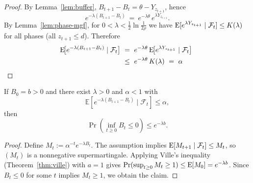 \begin{proof}
	By Lemma~\ref{lem:buffer}, $B_{t+1}-B_t=\theta-Y_{z_{t+1}}$, hence
	\[
	e^{-\lambda(B_{t+1}-B_t)}\ =\ e^{-\lambda\theta}\,e^{\lambda Y_{z_{t+1}}}.
	\]
	By Lemma~\ref{lem:phase-mgf}, for $0<\lambda<\tfrac12\ln\!\tfrac{1}{2\rho}$ we have %
	$\text{E}[e^{\lambda Y_{z_{t+1}}}\mid\mathcal F_t]\le K(\lambda)$ for all phases (all $z_{t+1}\le d$). Therefore
	\begin{align*}
		\text{E}\!\big[e^{-\lambda(B_{t+1}-B_t)}\mid \mathcal F_t\big]
		\ &=\ e^{-\lambda\theta}\,\text{E}\!\big[e^{\lambda Y_{z_{t+1}}}\mid\mathcal F_t\big]
		\ \\ &\le\ e^{-\lambda\theta}\,K(\lambda)
		\ =\ \alpha	
	\end{align*}
\end{proof}



\begin{corollary}%
	If $B_0=b>0$ and there exist $\lambda>0$ and $\alpha<1$ with
	\[
	\mathbb{E}[e^{-\lambda(B_{t+1}-B_t)}\mid\mathcal{F}_t]\le\alpha,
	\]
	then
	\[
	\Pr\!\left(\inf_{t\ge0} B_t \le 0\right) \le e^{-\lambda b}.
	\]
\end{corollary}

\begin{proof}
	Define $M_t:=\alpha^{-t}e^{-\lambda B_t}$. The assumption implies
	$\text{E}[M_{t+1}\mid\mathcal F_t]\le M_t$, so $(M_t)$ is a nonnegative supermartingale.
	Applying Ville’s inequality (Theorem~\ref{thm:ville}) with $a=1$ gives
	$\Pr(\sup_{t\ge 0} M_t\ge 1)\le \text{E}[M_0]=e^{-\lambda b}$.
	Since $B_t\le 0$ for some $t$ implies $M_t\ge 1$, we obtain the claim.
	
\end{proof}






